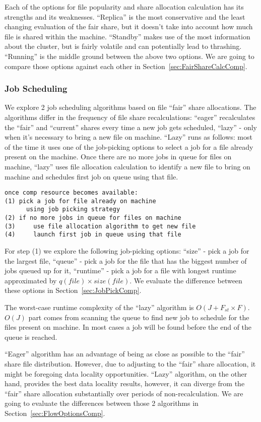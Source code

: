 Each of the options for file popularity and share allocation calculation has its strengths and its weaknesses. ``Replica'' is the most conservative and the least changing evaluation of the fair share, but it doesn't take into account how much file is shared within the machine. ``Standby'' makes use of the most information about the cluster, but is fairly volatile and can potentially lead to thrashing. ``Running'' is the middle ground between the above two options. We are going to compare those options against each other in Section~\ref{sec:FairShareCalcComp}.

\subsubsection{\label{sec:JobSched}Job Scheduling}
We explore 2 job scheduling algorithms based on file ``fair'' share allocations. The algorithms differ in the frequency of file share recalculations: ``eager'' recalculates the ``fair'' and ``current'' shares every time a new job gets scheduled, ``lazy'' - only when it's necessary to bring a new file on machine. ``Lazy'' runs as follows: most of the time it uses one of the job-picking options to select a job for a file already present on the machine. Once there are no more jobs in queue for files on machine, ``lazy'' uses file allocation calculation to identify a new file to bring on machine and schedules first job on queue using that file.\begin{verbatim}once comp resource becomes available:
(1) pick a job for file already on machine
      using job picking strategy
(2) if no more jobs in queue for files on machine
(3)     use file allocation algorithm to get new file
(4)     launch first job in queue using that file
\end{verbatim}
For step (1) we explore the following job-picking options: ``size'' - pick a job for the largest file, ``queue'' - pick a job for the file that has the biggest number of jobs queued up for it, ``runtime'' - pick a job for a file with longest runtime approximated by $q(file) \times size(file)$. We evaluate the difference between these options in Section~\ref{sec:JobPickComp}.

The worst-case runtime complexity of the ``lazy'' algorithm is $O(J + F_{st}\times F)$. $O(J)$ part comes from scanning the queue to find new job to schedule for the files present on machine. In most cases a job will be found before the end of the queue is reached.

``Eager'' algorithm has an advantage of being as close as possible to the ``fair'' share file distribution. However, due to adjusting to the ``fair'' share allocation, it might be foregoing data locality opportunities. ``Lazy'' algorithm, on the other hand, provides the best data locality results, however, it can diverge from the ``fair'' share allocation substantially over periods of non-recalculation. We are going to evaluate the differences between those 2 algorithms in Section~\ref{sec:FlowOptionsComp}.

